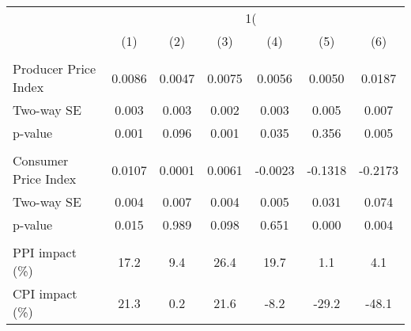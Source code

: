{
\def\sym#1{\ifmmode^{#1}\else\(^{#1}\)\fi}
\begin{tabular}{l*{6}{c}}
\hline\hline
                    &&&\\\cmidrule(lr){2-3}\cmidrule(lr){4-5}\cmidrule(lr){6-7}
                    &         &         &         &         &         &         \\
\hline
\hline
\\ Producer Price Index&      0.0086         &      0.0047         &      0.0075         &      0.0056         &      0.0050         &      0.0187         \\
\hspace{15pt} Two-way SE&       0.003         &       0.003         &       0.002         &       0.003         &       0.005         &       0.007         \\
\hspace{25pt} p-value&       0.001         &       0.096         &       0.001         &       0.035         &       0.356         &       0.005         \\
\\ Consumer Price Index&      0.0107         &      0.0001         &      0.0061         &     -0.0023         &     -0.1318         &     -0.2173         \\
\hspace{15pt} Two-way SE&       0.004         &       0.007         &       0.004         &       0.005         &       0.031         &       0.074         \\
\hspace{25pt} p-value&       0.015         &       0.989         &       0.098         &       0.651         &       0.000         &       0.004         \\
\hline \\ PPI impact (\%)&        17.2         &         9.4         &        26.4         &        19.7         &         1.1         &         4.1         \\
CPI impact (\%)     &        21.3         &         0.2         &        21.6         &        -8.2         &       -29.2         &       -48.1         \\

\end{tabular}}
